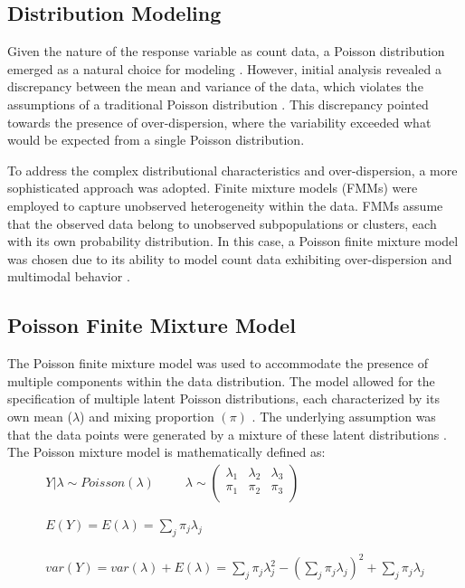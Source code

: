 \documentclass[a4paper, 12pt]{article}
\begin{document}
\subsection{ Distribution Modeling}
Given the nature of the response variable as count data, a Poisson distribution emerged as a natural choice for modeling \cite{molenberghs2017}. However, initial analysis revealed a discrepancy between the mean and variance of the data, which violates the assumptions of a traditional Poisson distribution \cite{molenberghs2017}. This discrepancy pointed towards the presence of over-dispersion, where the variability exceeded what would be expected from a single Poisson distribution.

To address the complex distributional characteristics and over-dispersion, a more sophisticated approach was adopted. Finite mixture models (FMMs) were employed to capture unobserved heterogeneity within the data. FMMs assume that the observed data belong to unobserved subpopulations or clusters, each with its own probability distribution. In this case, a Poisson finite mixture model was chosen due to its ability to model count data exhibiting over-dispersion and multimodal behavior \cite{molenberghs2017}.

\subsection{Poisson Finite Mixture Model}
The Poisson finite mixture model was used to accommodate the presence of multiple components within the data distribution. The model allowed for the specification of multiple latent Poisson distributions, each characterized by its own mean ($\lambda$) and mixing proportion $(\pi)$ \cite{molenberghs2017}. The underlying assumption was that the data points were generated by a mixture of these latent distributions \cite{molenberghs2017}. The Poisson mixture model is mathematically defined as:\\
 \begin{eqnarray*}
	 Y|\lambda  \sim  Poisson(\lambda)   {~~~~~~~~~~~}  \lambda \sim \left(\begin{array}{cccc|cc} \lambda_1 &\lambda_2 & \lambda_3\\
	 \pi_1 &\pi_2&\pi_3\\
	 \end{array}\right)\\ \\ \\
     E(Y)=E(\lambda)=\sum_j \pi_j\lambda_j\\ \\ \\
     var(Y)=var(\lambda)+E(\lambda)=\sum_j \pi_j\lambda_j^2 -(\sum_j \pi_j\lambda_j)^2 +\sum_j \pi_j\lambda_j
	 \end{eqnarray*} 
\end{document}
